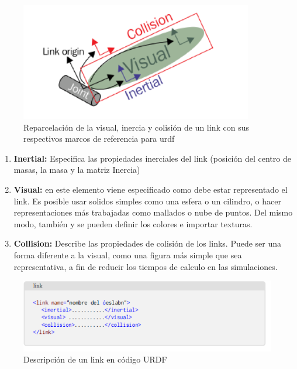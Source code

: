         \begin{figure}[htb]
            \centering
            \includegraphics[width=0.8\linewidth]{Main/Chapter3/Images3/3-7/eslabon2.png}
            \caption{Reparcelación de la visual, inercia y colisión de un link con sus respectivos marcos de referencia para urdf  \cite{urdftutorials}}
            \label{f:Cap3-7_noseee_urdf}
        \end{figure} 

        \begin{enumerate}
            \item \textbf{Inertial:} Especifica las propiedades inerciales del link (posición del centro de masas, la masa y la matriz Inercia)
            \item \textbf{Visual:} en este elemento viene especificado como debe estar representado el link. Es posible usar solidos simples como una esfera o un cilindro, o hacer representaciones más trabajadas como mallados o nube de puntos. Del mismo modo, también y se pueden definir los colores e importar texturas.
            \item \textbf{Collision:} Describe las propiedades de colisión de los links. Puede ser una forma diferente a la visual, como una figura más simple que sea representativa, a fin de reducir los tiempos de calculo en las simulaciones.
        \end{enumerate}
        
        \begin{figure}[htb]
            \centering
            \includegraphics[width=0.9\linewidth]{Main/Chapter3/Images3/3-7/codigo.png}
            \caption{Descripción de un link en código URDF}
            \label{f:Cap3-7_nose_nose}
        \end{figure} 
        
